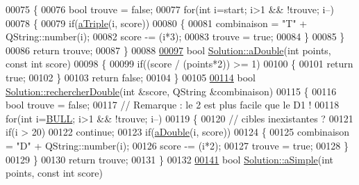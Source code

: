 \begin{DoxyCode}
00075 \{
00076     \textcolor{keywordtype}{bool} trouve = \textcolor{keyword}{false};
00077     \textcolor{keywordflow}{for}(\textcolor{keywordtype}{int} i=start; i>1 && !trouve; i--)
00078     \{
00079         \textcolor{keywordflow}{if}(\hyperlink{class_solution_af8062e8e2997f8a7451e439ce23dd544}{aTriple}(i, score))
00080         \{
00081             combinaison = \textcolor{stringliteral}{"T"} + QString::number(i);
00082             score -= (i*3);
00083             trouve = \textcolor{keyword}{true};
00084         \}
00085     \}
00086     \textcolor{keywordflow}{return} trouve;
00087 \}
00088 
\hyperlink{class_solution_ad79929c887a394883a154ea2ca9c3aac}{00097} \textcolor{keywordtype}{bool} \hyperlink{class_solution_ad79929c887a394883a154ea2ca9c3aac}{Solution::aDouble}(\textcolor{keywordtype}{int} points, \textcolor{keyword}{const} \textcolor{keywordtype}{int} score)
00098 \{
00099     \textcolor{keywordflow}{if}((score / (points*2)) >= 1)
00100     \{
00101         \textcolor{keywordflow}{return} \textcolor{keyword}{true};
00102     \}
00103     \textcolor{keywordflow}{return} \textcolor{keyword}{false};
00104 \}
00105 
\hyperlink{class_solution_aa54574bee5bde60d55a9da346a61cf48}{00114} \textcolor{keywordtype}{bool} \hyperlink{class_solution_aa54574bee5bde60d55a9da346a61cf48}{Solution::rechercherDouble}(\textcolor{keywordtype}{int} &score, QString &combinaison)
00115 \{
00116     \textcolor{keywordtype}{bool} trouve = \textcolor{keyword}{false};
00117     \textcolor{comment}{// Remarque : le 2 est plus facile que le D1 !}
00118     \textcolor{keywordflow}{for}(\textcolor{keywordtype}{int} i=\hyperlink{darts_8h_ac26e54839269cea6c170f2699af4ead2}{BULL}; i>1 && !trouve; i--)
00119     \{
00120         \textcolor{comment}{// cibles inexistantes ?}
00121         \textcolor{keywordflow}{if}(i > 20)
00122             \textcolor{keywordflow}{continue};
00123         \textcolor{keywordflow}{if}(\hyperlink{class_solution_ad79929c887a394883a154ea2ca9c3aac}{aDouble}(i, score))
00124         \{
00125             combinaison = \textcolor{stringliteral}{"D"} + QString::number(i);
00126             score -= (i*2);
00127             trouve = \textcolor{keyword}{true};
00128         \}
00129     \}
00130     \textcolor{keywordflow}{return} trouve;
00131 \}
00132 
\hyperlink{class_solution_a932ab2aea629d049202e8f8e38cc01b3}{00141} \textcolor{keywordtype}{bool} \hyperlink{class_solution_a932ab2aea629d049202e8f8e38cc01b3}{Solution::aSimple}(\textcolor{keywordtype}{int} points, \textcolor{keyword}{const} \textcolor{keywordtype}{int} score)

\end{DoxyCode}
